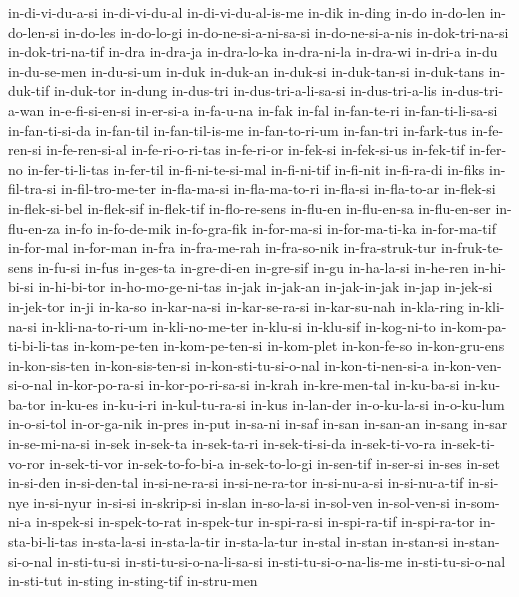 {in-di-vi-du-a-si in-di-vi-du-al in-di-vi-du-al-is-me in-dik in-ding in-do
in-do-len in-do-len-si in-do-les in-do-lo-gi in-do-ne-si-a-ni-sa-si
in-do-ne-si-a-nis in-dok-tri-na-si in-dok-tri-na-tif in-dra in-dra-ja
in-dra-lo-ka in-dra-ni-la in-dra-wi in-dri-a in-du in-du-se-men
in-du-si-um in-duk in-duk-an in-duk-si in-duk-tan-si in-duk-tans
in-duk-tif in-duk-tor in-dung in-dus-tri in-dus-tri-a-li-sa-si
in-dus-tri-a-lis in-dus-tri-a-wan in-e-fi-si-en-si in-er-si-a in-fa-u-na
in-fak in-fal in-fan-te-ri in-fan-ti-li-sa-si in-fan-ti-si-da in-fan-til
in-fan-til-is-me in-fan-to-ri-um in-fan-tri in-fark-tus in-fe-ren-si
in-fe-ren-si-al in-fe-ri-o-ri-tas in-fe-ri-or in-fek-si in-fek-si-us
in-fek-tif in-fer-no in-fer-ti-li-tas in-fer-til in-fi-ni-te-si-mal
in-fi-ni-tif in-fi-nit in-fi-ra-di in-fiks in-fil-tra-si in-fil-tro-me-ter
in-fla-ma-si in-fla-ma-to-ri in-fla-si in-fla-to-ar in-flek-si
in-flek-si-bel in-flek-sif in-flek-tif in-flo-re-sens in-flu-en
in-flu-en-sa in-flu-en-ser in-flu-en-za in-fo in-fo-de-mik in-fo-gra-fik
in-for-ma-si in-for-ma-ti-ka in-for-ma-tif in-for-mal in-for-man in-fra
in-fra-me-rah in-fra-so-nik in-fra-struk-tur in-fruk-te-sens in-fu-si
in-fus in-ges-ta in-gre-di-en in-gre-sif in-gu in-ha-la-si in-he-ren
in-hi-bi-si in-hi-bi-tor in-ho-mo-ge-ni-tas in-jak in-jak-an in-jak-in-jak
in-jap in-jek-si in-jek-tor in-ji in-ka-so in-kar-na-si in-kar-se-ra-si
in-kar-su-nah in-kla-ring in-kli-na-si in-kli-na-to-ri-um in-kli-no-me-ter
in-klu-si in-klu-sif in-kog-ni-to in-kom-pa-ti-bi-li-tas in-kom-pe-ten
in-kom-pe-ten-si in-kom-plet in-kon-fe-so in-kon-gru-ens in-kon-sis-ten
in-kon-sis-ten-si in-kon-sti-tu-si-o-nal in-kon-ti-nen-si-a
in-kon-ven-si-o-nal in-kor-po-ra-si in-kor-po-ri-sa-si in-krah
in-kre-men-tal in-ku-ba-si in-ku-ba-tor in-ku-es in-ku-i-ri
in-kul-tu-ra-si in-kus in-lan-der in-o-ku-la-si in-o-ku-lum in-o-si-tol
in-or-ga-nik in-pres in-put in-sa-ni in-saf in-san in-san-an in-sang
in-sar in-se-mi-na-si in-sek in-sek-ta in-sek-ta-ri in-sek-ti-si-da
in-sek-ti-vo-ra in-sek-ti-vo-ror in-sek-ti-vor in-sek-to-fo-bi-a
in-sek-to-lo-gi in-sen-tif in-ser-si in-ses in-set in-si-den in-si-den-tal
in-si-ne-ra-si in-si-ne-ra-tor in-si-nu-a-si in-si-nu-a-tif in-si-nye
in-si-nyur in-si-si in-skrip-si in-slan in-so-la-si in-sol-ven
in-sol-ven-si in-som-ni-a in-spek-si in-spek-to-rat in-spek-tur
in-spi-ra-si in-spi-ra-tif in-spi-ra-tor in-sta-bi-li-tas in-sta-la-si
in-sta-la-tir in-sta-la-tur in-stal in-stan in-stan-si in-stan-si-o-nal
in-sti-tu-si in-sti-tu-si-o-na-li-sa-si in-sti-tu-si-o-na-lis-me
in-sti-tu-si-o-nal in-sti-tut in-sting in-sting-tif in-stru-men
}
